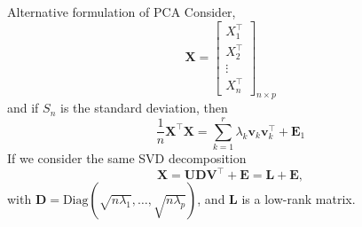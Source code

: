 \documentclass[10pt]{beamer}
\newcommand{\bb}[1]{\boldsymbol{#1}}
\newcommand{\tr}{^{\intercal}}
\begin{document}
\begin{frame}{Alternative formulation of PCA}
    Consider, 
    \begin{equation*}
        \bb{X} = \begin{bmatrix}
            X_1\tr \\ X_2\tr \\ \vdots \\ X_n\tr
        \end{bmatrix}_{n \times p}
    \end{equation*}
    \noindent and if $S_n$ is the standard deviation, then 
    \begin{equation*}
        \dfrac{1}{n}\bb{X}\tr\bb{X} = \sum_{k=1}^{r} \lambda_k \bb{v}_k\bb{v}_k\tr + \bb{E}_1
    \end{equation*}
    \pause
    \noindent If we consider the same SVD decomposition
    \begin{equation*}
        \bb{X} = \bb{UDV}\tr + \bb{E} = \bb{L} + \bb{E},
    \end{equation*}    
    \noindent with $\bb{D} = \text{Diag}(\sqrt{n\lambda_1}, \dots, \sqrt{n \lambda_p})$, and $\bb{L}$ is a low-rank matrix.
\end{frame}
\end{document}
